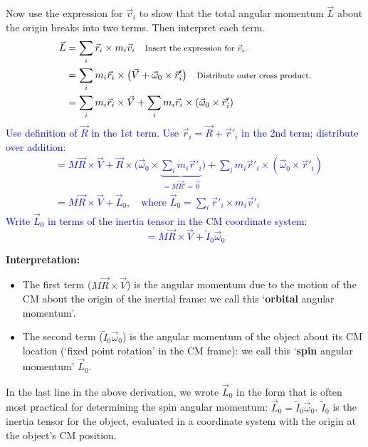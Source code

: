 \documentclass[11pt, letterpaper, openany]{book}
\newenvironment{exercise}[1][Exercise]{%
  \tcolorbox[blanker, breakable, left=1em,
    before skip=1em, after skip=1em,
    borderline west={3pt}{0pt}{PhysNavy},
    colback=PhysCream,
    before upper={\textcolor{PhysNavy}{\sffamily\bfseries #1:}\space}
  ]%
}{%
  \endtcolorbox%
}
\begin{document}
\begin{exercise}[Exercise 8]
Now use the expression for $\vec{v}_i$ to show that the total angular momentum $\vec{L}$ about the origin breaks into two terms. Then interpret each term. \\
\textcolor{blue}{
\begin{align*}
    \vec{L} &= \sum_i \vec{r}_i \times m_i\vec{v}_i \quad \text{\footnotesize{Insert the expression for $\vec{v}_i$.}} \\
    &= \sum_i m_i \vec{r}_i \times \bigl(\vec{V} + \vec{\omega}_0 \times \vec{r}'_i\bigr) \quad \text{\footnotesize{Distribute outer cross product.}} \\
    &= \sum_i m_i \vec{r}_i \times \vec{V} + \sum_i m_i \vec{r}_i \times (\vec{\omega}_0 \times \vec{r}'_i)
\end{align*}
Use definition of $\vec{R}$ in the 1st term. Use $\vec{r}_i = \vec{R} + \vec{r}'_i$ in the 2nd term; distribute over addition:
\begin{align*}
    &= M\vec{R} \times \vec{V} + \vec{R} \times \bigl(\vec{\omega}_0 \times \underbrace{\sum_i m_i \vec{r}'_i}_{=M\vec{R}'=\vec{0}}\bigr) + \sum_i m_i \vec{r}'_i \times (\vec{\omega}_0 \times \vec{r}'_i) \\
    &= M\vec{R} \times \vec{V} + \vec{L}_0, \quad \text{where } \vec{L}_0 = \sum_i \vec{r}'_i \times m_i \vec{v}'_i
\end{align*}
Write $\vec{L}_0$ in terms of the inertia tensor in the CM coordinate system:
\[ = M\vec{R} \times \vec{V} + \tilde{I}_0\vec{\omega}_0 \]
}
\end{exercise}

\textbf{Interpretation:}
\begin{itemize}
    \item The first term ($M\vec{R} \times \vec{V}$) is the angular momentum due to the motion of the CM about the origin of the inertial frame: we call this `\textbf{orbital} angular momentum'.
    \item The second term ($\tilde{I}_0\vec{\omega}_0$) is the angular momentum of the object about its CM location (`fixed point rotation' in the CM frame): we call this `\textbf{spin} angular momentum' $\vec{L}_0$.
\end{itemize}

In the last line in the above derivation, we wrote $\vec{L}_0$ in the form that is often most practical for determining the spin angular momentum: $\vec{L}_0 = \tilde{I}_0\vec{\omega}_0$. $\tilde{I}_0$ is the inertia tensor for the object, evaluated in a coordinate system with the origin at the object's CM position.
\end{document}
